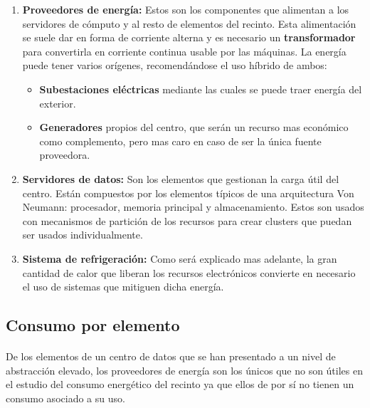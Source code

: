\documentclass[10pt]{article}
\begin{document}
            \begin{enumerate}
            	\item \textbf{Proveedores de energía:} Estos son los componentes que alimentan a los servidores de cómputo y al resto de elementos del recinto. Esta alimentación se suele dar en forma de corriente alterna y es necesario un \textbf{transformador} para convertirla en corriente continua usable por las máquinas. La energía puede tener varios orígenes, recomendándose el uso híbrido de ambos:
                	\begin{itemize}
                		\item \textbf{Subestaciones eléctricas} mediante las cuales se puede traer energía del exterior.
                        \item \textbf{Generadores} propios del centro, que serán un recurso mas económico como complemento, pero mas caro en caso de ser la única fuente proveedora. 
                	\end{itemize}
                    
                  \item \textbf{Servidores de datos:} Son los elementos que gestionan la carga útil del centro. Están compuestos por los elementos típicos de una arquitectura Von Neumann: procesador, memoria principal y almacenamiento. Estos son usados con mecanismos de partición de los recursos para crear clusters que puedan ser usados individualmente.
                  
                  \item \textbf{Sistema de refrigeración:} Como será explicado mas adelante, la gran cantidad de calor que liberan los recursos electrónicos convierte en necesario el uso de sistemas que mitiguen dicha energía.
            \end{enumerate}
            
   \newpage
   
   \subsection{Consumo por elemento}
			\paragraph{}
            De los elementos de un centro de datos que se han presentado a un nivel de abstracción elevado, los proveedores de energía son los únicos que no son útiles en el estudio del consumo energético del recinto ya que ellos de por sí no tienen un consumo asociado a su uso.
            
\end{document}
